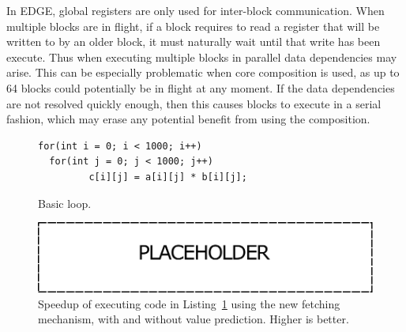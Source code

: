 In EDGE, global registers are only used for inter-block communication.
When multiple blocks are in flight, if a block requires to read a register that will be written to by an older block, it must naturally wait until that write has been execute.
Thus when executing multiple blocks in parallel data dependencies may arise.
This can be especially problematic when core composition is used, as up to 64 blocks could potentially be in flight at any moment.
If the data dependencies are not resolved quickly enough, then this causes blocks to execute in a serial fashion, which may erase any potential benefit from using the composition.


\begin{figure}[t]
\lstset{language=C,numbersep=4pt}
\begin{center}
\begin{lstlisting}
for(int i = 0; i < 1000; i++)
  for(int j = 0; j < 1000; j++)
         c[i][j] = a[i][j] * b[i][j];
\end{lstlisting}
\end{center}
\vspace{-1em}
\caption{Basic loop.}
\label{lst:bloop}
\vspace{1em}
\end{figure}

\begin{figure}[t]
    \centering
    \includegraphics[width=1\textwidth]{chapter3/graphics/wip.pdf}

    \caption{Speedup of executing code in Listing~\ref{lst:bloop} using the new fetching mechanism, with and without value prediction. Higher is better.}
    \label{fig:motivation_reg}
	\vspace{1em}
\end{figure}

